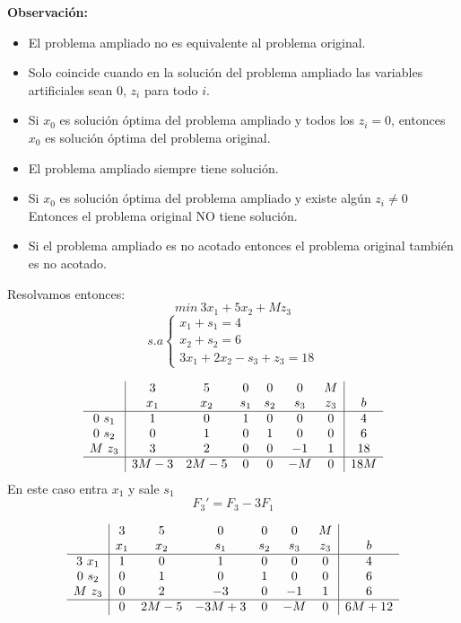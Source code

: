 \documentclass[11pt,fleqn]{book} %
\begin{document}
\textbf{Observación: }
\begin{itemize}
\item El problema ampliado no es equivalente al problema original. 
\item Solo coincide cuando en la solución del problema ampliado las variables artificiales sean $0$, $z_i$ para todo $i$.
\item Si $x_0$ es solución óptima del problema ampliado y todos los $z_i=0$, entonces $x_0$ es solución óptima del problema original. 
\item El problema ampliado siempre tiene solución.
\item Si $x_0$ es solución óptima del problema ampliado y existe algún $z_i \neq 0$ \\
  Entonces el problema original NO tiene solución.
\item Si el problema ampliado es no acotado entonces el problema original también es no acotado.
\end{itemize} 
Resolvamos entonces:
$$ min ~ 3x_1+5x_2+M z_3 $$
$$ s.a \left\{
\begin{array}{c}
  x_1+s_1=4 \\
  x_2 + s_2 = 6 \\
  3x_1+2x_2-s_3+z_3=18
\end{array}
\right.
$$

$$ \begin{array}{c|cccccc|c}
  & 3 & 5 & 0 & 0 & 0 & M & \\
  & x_1 & x_2 & s_1 & s_2 & s_3 & z_3 & b \\ \hline
  0 ~ s_1 & 1 & 0 & 1 & 0 & 0 & 0 & 4 \\
  0 ~ s_2 & 0 & 1 & 0 & 1 & 0 & 0 & 6 \\
  M ~ z_3 & 3 & 2 & 0 & 0 & -1 & 1 & 18 \\ \hline
  & 3M-3 & 2M-5 & 0 & 0 & -M & 0 & 18M
\end{array}
$$
En este caso entra $x_1$ y sale $s_1$
$$F_3'=F_3-3F_1$$

$$ \begin{array}{c|cccccc|c}
  & 3 & 5 & 0 & 0 & 0 & M & \\
  & x_1 & x_2 & s_1 & s_2 & s_3 & z_3 & b \\ \hline
  3 ~ x_1 & 1 & 0 & 1 & 0 & 0 & 0 & 4 \\
  0 ~ s_2 & 0 & 1 & 0 & 1 & 0 & 0 & 6 \\
  M ~ z_3 & 0 & 2 & -3 & 0 & -1 & 1 & 6 \\ \hline
  & 0 & 2M-5 & -3M+3 & 0 & -M & 0 & 6M+12
\end{array}
$$
\end{document}
